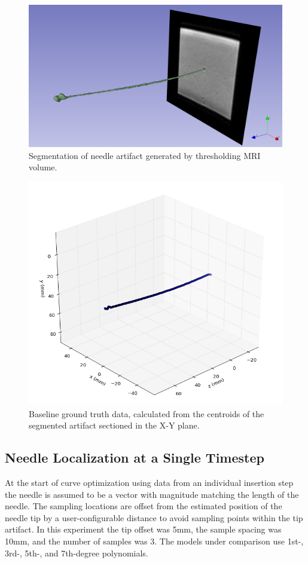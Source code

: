 \begin{figure}[h]
\includegraphics[width=1.0\textwidth]{Fig/chap5/segmented_artifact_2001.png}
\caption{Segmentation of needle artifact generated by thresholding MRI volume.}
\label{fig:seg_2001}
\end{figure}

\begin{figure}[h]
\includegraphics[width=1.0\textwidth]{Fig/chap5/neutral_axis_2001_b.png}
\caption{Baseline ground truth data, calculated from the centroids of the segmented artifact sectioned in the X-Y plane.}
\label{fig:ground_truth_2001}
\end{figure}

\subsection{Needle Localization at a Single Timestep}
\label{sec:mri_single_timestep}
At the start of curve optimization using data from an individual insertion step the needle is assumed to be a vector with magnitude matching the length of the needle. The sampling locations are offset from the estimated position of the needle tip by a user-configurable distance to avoid sampling points within the tip artifact. In this experiment the tip offset was 5mm, the sample spacing was 10mm, and the number of samples was 3. The models under comparison use 1st-, 3rd-, 5th-, and 7th-degree polynomials.

